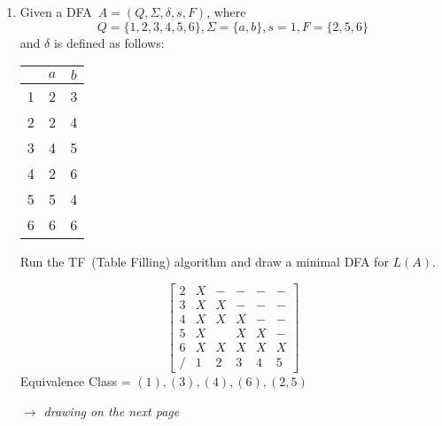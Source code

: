 \documentclass[paper=a4, fontsize=11pt]{scrartcl}
\begin{document}
\begin{enumerate}
\item 
Given a DFA~$A=(Q, \Sigma, \delta, s, F)$, where
$$Q = \{1,2,3,4,5,6\}, \Sigma = \{a,b\}, s = 1, F = \{2,5,6\}$$ and
$\delta$
is defined as follows:
\begin{center}
\begin{tabular}{ l || c | c }
 & $a$ & $b$\\
\hline \hline
1 & 2 & 3\\
2 & 2 & 4\\
3 & 4 & 5\\
4 & 2 & 6\\
5 & 5 & 4\\
6 & 6 & 6
\end{tabular}
\end{center}

Run the TF~(Table Filling) algorithm and  draw a minimal DFA
for $L(A)$.

\vspace{1cm}
\[
  \begin{bmatrix}
    2 & X & - & - & - & - \\
    3 & X & X & - & - & - \\
    4 & X & X & X & - & - \\
    5 & X &  & X & X & - \\
    6 & X & X & X & X & X \\
     / & 1 & 2 & 3 & 4 & 5 
  \end{bmatrix}
\]
Equivalence Class = $(1), (3), (4), (6), (2,5)$

\vspace{1cm}
\textit{$\rightarrow$ drawing on the next page}

\newpage


\end{enumerate}
\end{document}
